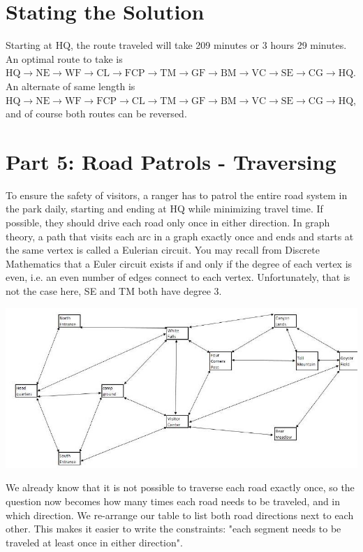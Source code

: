 \documentclass[10pt]{article}
\begin{document}
\section{Stating the Solution}
Starting at $\mathrm{HQ}$, the route traveled will take 209 minutes or 3 hours 29 minutes. An optimal route to take is $\mathrm{HQ} \rightarrow \mathrm{NE} \rightarrow \mathrm{WF} \rightarrow \mathrm{CL} \rightarrow \mathrm{FCP} \rightarrow \mathrm{TM} \rightarrow \mathrm{GF} \rightarrow \mathrm{BM} \rightarrow \mathrm{VC} \rightarrow \mathrm{SE} \rightarrow \mathrm{CG} \rightarrow \mathrm{HQ} .$ An alternate of same length is $\mathrm{HQ} \rightarrow \mathrm{NE} \rightarrow \mathrm{WF} \rightarrow \mathrm{FCP} \rightarrow \mathrm{CL} \rightarrow \mathrm{TM} \rightarrow \mathrm{GF} \rightarrow \mathrm{BM} \rightarrow \mathrm{VC} \rightarrow \mathrm{SE} \rightarrow \mathrm{CG} \rightarrow \mathrm{HQ}$, and of course both routes can be reversed.

\section{Part 5: Road Patrols - Traversing}
To ensure the safety of visitors, a ranger has to patrol the entire road system in the park daily, starting and ending at HQ while minimizing travel time. If possible, they should drive each road only once in either direction. In graph theory, a path that visits each arc in a graph exactly once and ends and starts at the same vertex is called a Eulerian circuit. You may recall from Discrete Mathematics that a Euler circuit exists if and only if the degree of each vertex is even, i.e. an even number of edges connect to each vertex. Unfortunately, that is not the case here, SE and TM both have degree $3 .$

\includegraphics[max width=\textwidth]{2022_07_05_5945264bba2a5f6ba667g-59}

We already know that it is not possible to traverse each road exactly once, so the question now becomes how many times each road needs to be traveled, and in which direction. We re-arrange our table to list both road directions next to each other. This makes it easier to write the constraints: "each segment needs to be traveled at least once in either direction".
\end{document}
